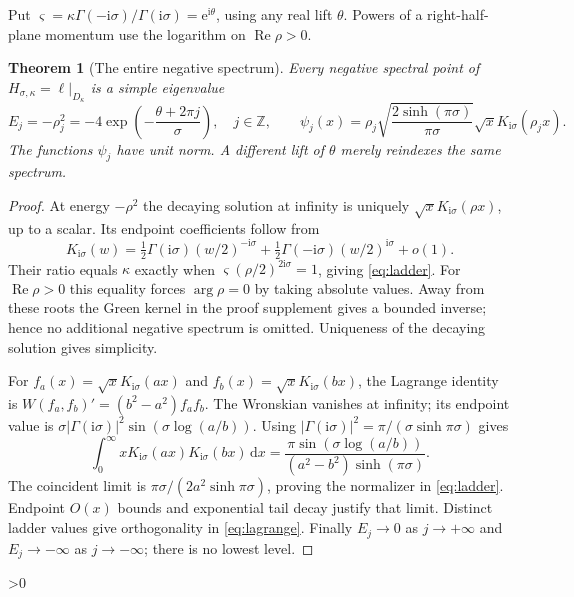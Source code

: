\documentclass[10pt]{article}
\newcommand{\ii}{\mathrm i}
\newcommand{\e}{\mathrm e}
\newcommand{\dd}{\,\mathrm d}
\newcommand{\Z}{\mathbb Z}
\DeclareMathOperator{\Ree}{Re}
\newtheorem{theorem}{Theorem}
\begin{document}
Put $\varsigma=\kappa\Gamma(-\ii\sigma)/\Gamma(\ii\sigma)=\e^{\ii\theta}$,
using any real lift $\theta$. Powers of a right-half-plane momentum use
the logarithm on $\Ree\rho>0$.
\begin{theorem}[The entire negative spectrum]
Every negative spectral point of $H_{\sigma,\kappa}=\ell|_{D_\kappa}$
is a simple eigenvalue
\begin{equation}
 E_j=-\rho_j^2=-4\exp\!\left(-\frac{\theta+2\pi j}{\sigma}\right),
 \quad j\in\Z,\qquad
 \psi_j(x)=\rho_j\sqrt{\frac{2\sinh(\pi\sigma)}{\pi\sigma}}
 \sqrt x K_{\ii\sigma}(\rho_jx).
 \label{eq:ladder}
\end{equation}
The functions $\psi_j$ have unit norm. A different lift of $\theta$ merely
reindexes the same spectrum.
\end{theorem}
\begin{proof}
At energy $-\rho^2$ the decaying solution at infinity is uniquely
$\sqrt xK_{\ii\sigma}(\rho x)$, up to a scalar.
Its endpoint coefficients follow from
\[
 K_{\ii\sigma}(w)=\tfrac12\Gamma(\ii\sigma)(w/2)^{-\ii\sigma}
 +\tfrac12\Gamma(-\ii\sigma)(w/2)^{\ii\sigma}+o(1).
\]
Their ratio equals $\kappa$ exactly when
$\varsigma(\rho/2)^{2\ii\sigma}=1$, giving \eqref{eq:ladder}.
For $\Ree\rho>0$ this equality forces $\arg\rho=0$ by taking absolute values.
Away from these roots the Green kernel in the proof supplement gives a
bounded inverse; hence no additional negative spectrum is omitted.
Uniqueness of the decaying solution gives simplicity.

For $f_a(x)=\sqrt xK_{\ii\sigma}(ax)$ and $f_b(x)=\sqrt xK_{\ii\sigma}(bx)$,
the Lagrange identity is $W(f_a,f_b)'=(b^2-a^2)f_af_b$.
The Wronskian vanishes at infinity; its endpoint value is
$\sigma|\Gamma(\ii\sigma)|^2\sin(\sigma\log(a/b))$.
Using $|\Gamma(\ii\sigma)|^2=\pi/(\sigma\sinh\pi\sigma)$ gives
\begin{equation}
 \int_0^\infty xK_{\ii\sigma}(ax)K_{\ii\sigma}(bx)\dd x
 =\frac{\pi\sin(\sigma\log(a/b))}{(a^2-b^2)\sinh(\pi\sigma)}.
 \label{eq:lagrange}
\end{equation}
The coincident limit is $\pi\sigma/(2a^2\sinh\pi\sigma)$, proving the
normalizer in \eqref{eq:ladder}. Endpoint $O(x)$ bounds and exponential
tail decay justify that limit. Distinct ladder values give orthogonality
in \eqref{eq:lagrange}. Finally $E_j\to0$ as $j\to+\infty$ and
$E_j\to-\infty$ as $j\to-\infty$; there is no lowest level.
\end{proof}

\ifnum\CRevisionRound>0
\end{document}
